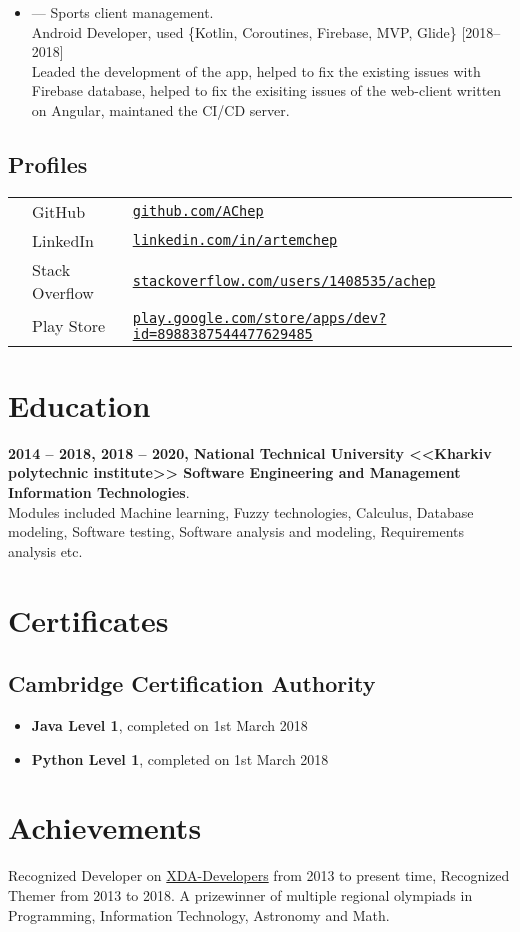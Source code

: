 \documentclass[a4paper]{article}
\begin{document}
\begin{itemize}
		\item \faAndroid {} --- Sports client management. \\[0.2em]
		{\footnotesize Android Developer, used \{Kotlin, Coroutines, Firebase, MVP, Glide\} \hfill [2018--2018]} \\[0.2em]
		Leaded the development of the app, helped to fix the existing issues with Firebase database, helped to fix the exisiting issues of the web-client written on Angular, maintaned the CI/CD server.

	\end{itemize}
	\subsection*{Profiles}
	\begin{tabular}{@{}lll}
		\faGithub & GitHub & \href{https://github.com/AChep}{\texttt{github.com/AChep}} \\
		\faLinkedin & LinkedIn & \href{https://www.linkedin.com/in/artemchep/}{\texttt{linkedin.com/in/artemchep}} \\
		\faStackOverflow & Stack Overflow & \href{https://stackoverflow.com/users/1408535/achep}{\texttt{stackoverflow.com/users/1408535/achep}} \\
		\faPlay & Play Store & \href{https://play.google.com/store/apps/dev?id=8988387544477629485}{\texttt{play.google.com/store/apps/dev?id=8988387544477629485}} \\
	\end{tabular}

	\section*{Education}
	\textbf{2014 -- 2018, 2018 -- 2020, National Technical University <<Kharkiv polytechnic institute>> Software Engineering and Management Information Technologies}. \\
	Modules included Machine learning, Fuzzy technologies, Calculus, Database modeling, Software testing, Software analysis and modeling, Requirements analysis etc.
	
	\section*{Certificates}
	\subsection*{Cambridge Certification Authority}
	\begin{itemize}
		\item \textbf{Java Level 1}, completed on 1st March 2018
		\item \textbf{Python Level 1}, completed on 1st March 2018
	\end{itemize}

	\section*{Achievements}
	Recognized Developer on \href{https://forum.xda-developers.com/member.php?u=3685328}{XDA-Developers} from 2013 to present time, Recognized Themer from 2013 to 2018.
	A prizewinner of multiple regional olympiads in Programming, Information Technology, Astronomy and Math.
\end{document}
